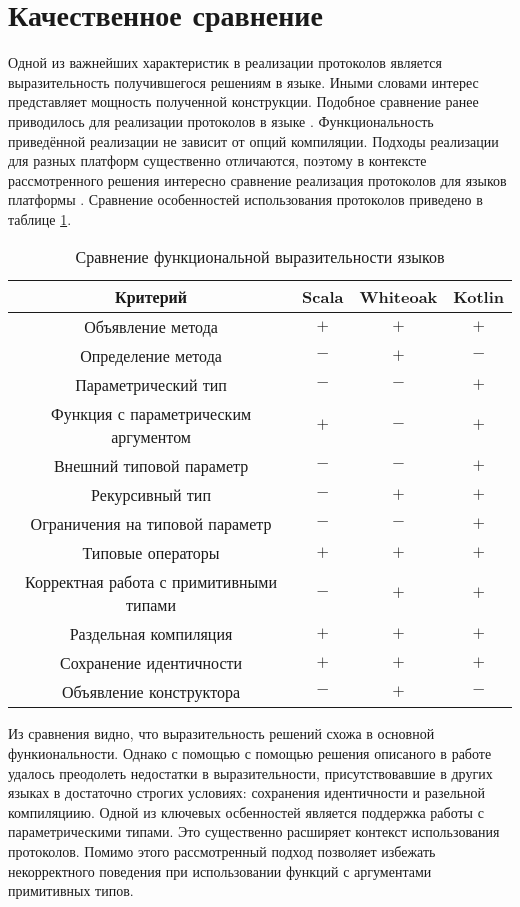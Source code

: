 \section{Качественное сравнение}
Одной из важнейших характеристик в реализации протоколов является выразительность получившегося решениям в языке. Иными словами интерес представляет мощность полученной конструкции. Подобное сравнение ранее приводилось для реализации протоколов в языке \cite{whiteoak}. Функциональность приведённой реализации не зависит от опций компиляции. Подходы реализации для разных платформ существенно отличаются, поэтому в контексте рассмотренного решения интересно сравнение реализация протоколов для языков платформы . Сравнение особенностей использования протоколов приведено в таблице \ref{features_comparison}.

\begin{table}[htb]
  \begin{center}
    \begin{tabular}{|c|c|c|c|} \hline
      Критерий & Scala & Whiteoak & Kotlin \\ \hline
      Объявление метода & $+$ & $+$ & $+$ \\ \hline
      Определение метода & $-$ & $+$ & $-$ \\ \hline
      Параметрический тип & $-$ & $-$ & $+$ \\ \hline
      Функция с параметрическим аргументом & $+$ & $-$ & $+$ \\ \hline
      Внешний типовой параметр & $-$ & $-$ & $+$ \\ \hline
      Рекурсивный тип & $-$ & $+$ & $+$ \\ \hline
      Ограничения на типовой параметр & $-$ & $-$ & $+$ \\ \hline
      Типовые операторы & $+$ & $+$ & $+$ \\ \hline
      Корректная работа с примитивными типами & $-$ & $+$ & $+$ \\ \hline
      Раздельная компиляция & $+$ & $+$ & $+$ \\ \hline
      Сохранение идентичности & $+$ & $+$ & $+$ \\ \hline
      Объявление конструктора & $-$ & $+$ & $-$ \\ \hline
    \end{tabular}
    \caption{Сравнение функциональной выразительности языков}
    \label{features_comparison}
  \end{center}
\end{table}

Из сравнения видно, что выразительность решений схожа в основной функиональности. Однако с помощью с помощью решения описаного в работе удалось преодолеть недостатки в выразительности, присутствовавшие в других языках в достаточно строгих условиях: сохранения идентичности и разельной компиляциию. Одной из ключевых осбенностей является поддержка работы с параметрическими типами. Это существенно расширяет контекст использования протоколов. Помимо этого рассмотренный подход позволяет избежать некорректного поведения при использовании функций с аргументами примитивных типов.
